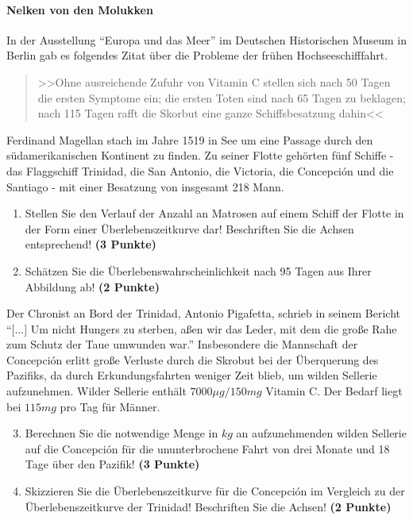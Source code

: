 \documentclass[a4paper, 10pt]{scrartcl}\usepackage[]{graphicx}\usepackage[]{xcolor}
\begin{document}
\paragraph{Nelken von den Molukken}



In der Ausstellung "`Europa und das Meer"' im Deutschen Historischen Museum in
Berlin gab es folgendes Zitat {\"u}ber die Probleme der fr{\"u}hen Hochseeschifffahrt.

\begin{quote}
  >>Ohne ausreichende Zufuhr von Vitamin C stellen sich nach 50 Tagen die
  ersten Symptome ein; die ersten Toten sind nach 65 Tagen zu beklagen;
  nach 115 Tagen rafft die Skorbut eine ganze Schiffsbesatzung dahin<<
\end{quote}

Ferdinand Magellan stach im Jahre 1519 in See um eine Passage durch den
s{\"u}damerikanischen Kontinent zu finden. Zu seiner Flotte geh{\"o}rten
f{\"u}nf Schiffe - das Flaggschiff Trinidad, die San Antonio, die Victoria, die
Concepci{\'o}n und die Santiago - mit einer Besatzung von insgesamt
218 Mann. 

\begin{enumerate}
\item Stellen Sie den Verlauf der Anzahl an Matrosen auf einem Schiff der
  Flotte in der Form einer {\"U}berlebenszeitkurve dar! Beschriften Sie die
  Achsen entsprechend! \textbf{(3 Punkte)} 
\item Sch{\"a}tzen Sie die {\"U}berlebenswahrscheinlichkeit nach 95 Tagen
  aus Ihrer Abbildung ab! \textbf{(2 Punkte)} 
\end{enumerate}


Der Chronist an Bord der Trinidad, Antonio Pigafetta, schrieb in seinem
Bericht "`[...] Um nicht Hungers zu sterben, a{\ss}en wir das Leder, mit dem
die gro{\ss}e Rahe zum Schutz der Taue umwunden war."' Insbesondere die
Mannschaft der Concepci{\'o}n erlitt gro{\ss}e Verluste durch die Skrobut bei der
{\"U}berquerung des Pazifiks, da durch Erkundungsfahrten weniger Zeit blieb, um
wilden Sellerie aufzunehmen. Wilder Sellerie enth{\"a}lt
$7000\mu g/150mg$ Vitamin C. Der Bedarf liegt bei
$115mg$ pro Tag f{\"u}r M{\"a}nner.

\begin{enumerate}
  \setcounter{enumi}{2}
\item Berechnen Sie die notwendige Menge in $kg$ an
  aufzunehmenden wilden Sellerie auf die Concepci{\'o}n f{\"u}r die ununterbrochene
  Fahrt von drei Monate und 18 Tage {\"u}ber den Pazifik!
  \textbf{(3 Punkte)}
\item Skizzieren Sie die {\"U}berlebenszeitkurve f{\"u}r die Concepci{\'o}n im
  Vergleich zu der {\"U}berlebenszeitkurve der Trinidad! Beschriften Sie die
  Achsen! \textbf{(2 Punkte)}
\end{enumerate}
\end{document}
